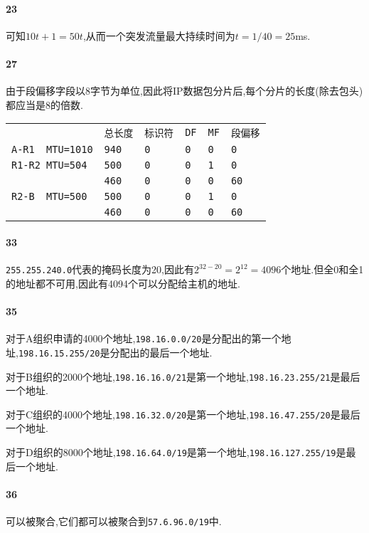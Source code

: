 \documentclass[a4paper]{article}
\begin{document}
\paragraph{23}
可知$10t+1=50t$,从而一个突发流量最大持续时间为$t=1/40=25$ms.
\paragraph{27}
由于段偏移字段以8字节为单位,因此将IP数据包分片后,每个分片的长度(除去包头)都应当是8的倍数.
\begin{table}[H]
    \begin{tabular}{|llllll|}
        \hline
                              & \verb|总长度| & \verb|标识符| & \verb|DF| & \verb|MF| & \verb|段偏移| \\
        \verb|A-R1  MTU=1010| & \verb|940| & \verb|0|   & \verb|0|  & \verb|0|  & \verb|0|   \\
        \verb|R1-R2 MTU=504|  & \verb|500| & \verb|0|   & \verb|0|  & \verb|1|  & \verb|0|   \\
                              & \verb|460| & \verb|0|   & \verb|0|  & \verb|0|  & \verb|60|  \\
        \verb|R2-B  MTU=500|  & \verb|500| & \verb|0|   & \verb|0|  & \verb|1|  & \verb|0|   \\
                              & \verb|460| & \verb|0|   & \verb|0|  & \verb|0|  & \verb|60|  \\ \hline
    \end{tabular}
\end{table}
\paragraph{33}
\verb|255.255.240.0|代表的掩码长度为20,因此有$2^{32-20}=2^{12}=4096$个地址.但全0和全1的地址都不可用,因此有4094个可以分配给主机的地址.
\paragraph{35}
对于A组织申请的4000个地址,\verb|198.16.0.0/20|是分配出的第一个地址,\verb|198.16.15.255/20|是分配出的最后一个地址.

对于B组织的2000个地址,\verb|198.16.16.0/21|是第一个地址,\verb|198.16.23.255/21|是最后一个地址.

对于C组织的4000个地址,\verb|198.16.32.0/20|是第一个地址,\verb|198.16.47.255/20|是最后一个地址.

对于D组织的8000个地址,\verb|198.16.64.0/19|是第一个地址,\verb|198.16.127.255/19|是最后一个地址.
\paragraph{36}
可以被聚合,它们都可以被聚合到\verb|57.6.96.0/19|中.
\end{document}
